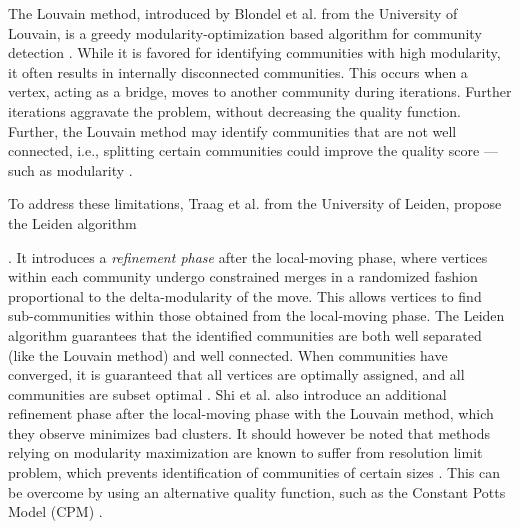 The Louvain method, introduced by Blondel et al. \cite{com-blondel08} from the University of Louvain, is a greedy modularity-optimization based algorithm for community detection \cite{com-lancichinetti09}. While it is favored for identifying communities with high modularity, it often results in internally disconnected communities. This occurs when a vertex, acting as a bridge, moves to another community during iterations. Further iterations aggravate the problem, without decreasing the quality function. Further, the Louvain method may identify communities that are not well connected, i.e., splitting certain communities could improve the quality score --- such as modularity \cite{com-traag19}.

To address these limitations, Traag et al. \cite{com-traag19} from the University of Leiden, propose the Leiden algorithm. It introduces a \textit{refinement phase} after the local-moving phase, where vertices within each community undergo constrained merges in a randomized fashion proportional to the delta-modularity of the move. This allows vertices to find sub-communities within those obtained from the local-moving phase. The Leiden algorithm guarantees that the identified communities are both well separated (like the Louvain method) and well connected. When communities have converged, it is guaranteed that all vertices are optimally assigned, and all communities are subset optimal \cite{com-traag19}. Shi et al. \cite{com-shi21} also introduce an additional refinement phase after the local-moving phase with the Louvain method, which they observe minimizes bad clusters. It should however be noted that methods relying on modularity maximization are known to suffer from resolution limit problem, which prevents identification of communities of certain sizes \cite{com-ghosh19, com-traag19}. This can be overcome by using an alternative quality function, such as the Constant Potts Model (CPM) \cite{com-traag11}.

